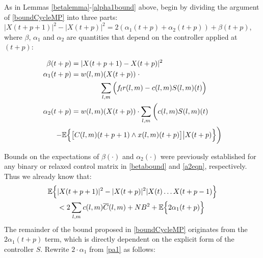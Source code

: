 \begin{IEEEproof}
As in Lemmas \ref{betalemma}-\ref{alpha1bound} above, begin by dividing the argument of \eqref{boundCycleMP} into three parts: $|X(t+ p + 1)|^{2} - |X(t + p)|^{2}  = 2(\alpha_1(t + p)+\alpha_2(t + p)) + \beta(t + p)$, 
where $\beta$, $\alpha_{1}$ and $\alpha_{2}$ are quantities that depend on the controller applied at $(t + p)$:
\begin{small}
\begin{align}
\beta (t+p)  &= \vert X(t + p + 1) - X(t + p) \vert^{2} \label{pbeta} \\
\alpha_{1} (t+p) &= w(l,m)(X(t + p)) \; \cdot \label{pa1} \\  \nonumber
& \qquad \qquad  \sum_{l,m} \Big(f_{l}r(l,m) - c(l,m)S(l,m)(t)\Big)\\ 
 \alpha_{2}  (t+p)&= w(l,m)(X(t + p)) \cdot \sum_{l,m} \bigg(c(l,m)S(l,m)(t) \label{pa2} \\ \nonumber
 - \expectation{ & \big[C(l,m)(t+p + 1)\wedge x(l,m)(t + p)\big] \big| X(t + p) }\bigg)
 \end{align}
 \end{small}Bounds on the expectations of  $\beta(\cdot)$ and $\alpha_2(\cdot)$ were previously established for any binary or relaxed control matrix in \eqref{betabound} and \eqref{a2eqn}, respectively. Thus we already know that:
\begin{align}\nonumber
\expectation{&\vert X(t + p + 1) \vert^2 - \vert X(t + p)\vert^2 \vert X(t) \ldots X(t + p - 1)} \\  \label{cbmpcombined1}
&< 2 \sum_{l,m} c(l,m)\overline{C}(l,m) + N B^2 + \expectation{2\alpha_1(t+p) }
\end{align}
The remainder of the bound proposed in \eqref{boundCycleMP} originates from the $2 \alpha_1 (t+p)$ term, which is directly dependent on the explicit form of the controller $S$. Rewrite $2\cdot\alpha_1$ from \eqref{pa1} as follows:

\end{IEEEproof}
